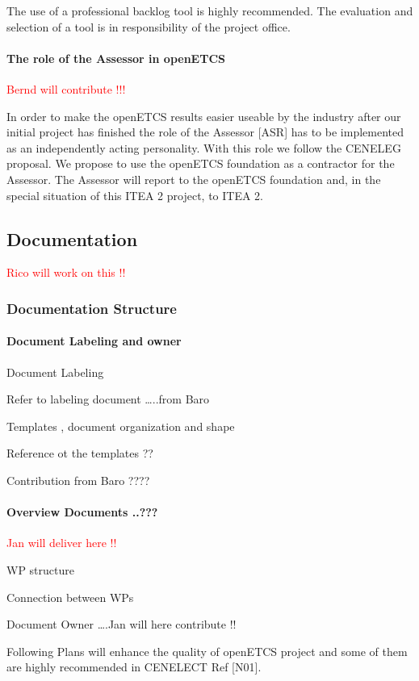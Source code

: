 \documentclass{template/openetcs_article}
\begin{document}
The use of a professional backlog tool is highly recommended. The evaluation and selection of a tool is in responsibility of the project office. 


\paragraph{The role of the Assessor in openETCS}
\textcolor{red}{Bernd will contribute !!!}

In order to make the openETCS results easier useable by the industry after our initial project has finished the role of the Assessor [ASR] has to be implemented as an independently acting personality. With this role we follow the CENELEG proposal. We propose to use the openETCS foundation as a contractor for the Assessor. The Assessor will report to the openETCS foundation and, in the special situation of this ITEA 2 project, to ITEA 2.


\subsection{Documentation}
\textcolor{red}{Rico will work on this !!}

\subsubsection{Documentation Structure}

\paragraph{Document Labeling and owner}
Document Labeling

Refer to labeling document {\dots}..from Baro 

Templates , document organization and shape 

Reference ot the templates ??

Contribution from Baro ????


\paragraph{Overview Documents ..???}
\textcolor{red}{Jan will deliver here !!}

WP structure

Connection between WPs

Document Owner {\dots}.Jan will here contribute !! 

Following Plans will enhance the quality of openETCS project and some of them are highly recommended in CENELECT Ref [N01].
\end{document}
